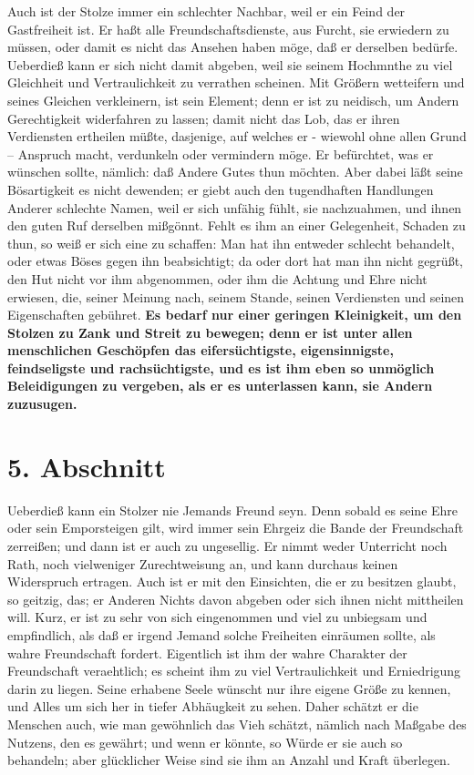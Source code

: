 Auch ist der Stolze immer ein schlechter Nachbar, weil er ein Feind der
Gastfreiheit ist. Er haßt alle Freundschaftsdienste, aus Furcht, sie erwiedern
zu müssen, oder damit es nicht das Ansehen haben möge, daß er derselben bedürfe.
Ueberdieß kann er sich nicht damit abgeben, weil sie seinem Hochmnthe zu viel
Gleichheit und Vertraulichkeit zu verrathen scheinen. Mit Größern wetteifern und
seines Gleichen verkleinern, ist sein Element; denn er ist zu neidisch, um
Andern Gerechtigkeit widerfahren zu lassen; damit nicht das Lob, das er ihren
Verdiensten ertheilen müßte, dasjenige, auf welches er - wiewohl ohne allen
Grund -- Anspruch macht, verdunkeln oder vermindern möge. Er befürchtet, was er
wünschen sollte, nämlich: daß Andere Gutes thun möchten. Aber dabei läßt seine
Bösartigkeit es nicht dewenden; er giebt auch den tugendhaften Handlungen
Anderer schlechte Namen, weil er sich unfähig fühlt, sie nachzuahmen, und ihnen
den guten Ruf derselben mißgönnt. Fehlt es ihm an einer Gelegenheit, Schaden zu
thun, so weiß er sich eine zu schaffen: Man hat ihn entweder schlecht behandelt,
oder etwas Böses gegen ihn beabsichtigt; da oder dort hat man ihn nicht gegrüßt,
den Hut nicht vor ihm abgenommen, oder ihm die Achtung und Ehre nicht erwiesen,
die, seiner Meinung nach, seinem Stande, seinen Verdiensten und seinen
Eigenschaften gebühret. \textbf{Es bedarf nur einer geringen Kleinigkeit, um den Stolzen
zu Zank und Streit zu bewegen; denn er ist unter allen menschlichen Geschöpfen
das eifersüchtigste, eigensinnigste, feindseligste und rachsüchtigste, und es
ist ihm eben so unmöglich Beleidigungen zu vergeben, als er es unterlassen kann,
sie Andern zuzusugen.}

\section{5. Abschnitt} \label{kap12_ab5}

Ueberdieß kann ein Stolzer nie Jemands Freund seyn. Denn sobald es seine Ehre
oder sein Emporsteigen gilt, wird immer sein Ehrgeiz die Bande der Freundschaft
zerreißen; und dann ist er auch zu ungesellig. Er nimmt weder Unterricht noch
Rath, noch vielweniger Zurechtweisung an, und kann durchaus keinen Widerspruch
ertragen. Auch ist er mit den Einsichten, die er zu besitzen glaubt, so geitzig,
das; er Anderen Nichts davon abgeben oder sich ihnen nicht mittheilen will.
Kurz, er ist zu sehr von sich eingenommen und viel zu unbiegsam und empfindlich,
als daß er irgend Jemand solche Freiheiten einräumen sollte, als wahre
Freundschaft fordert. Eigentlich ist ihm der wahre Charakter der Freundschaft
veraehtlich; es scheint ihm zu viel Vertraulichkeit und Erniedrigung darin zu
liegen. Seine erhabene Seele wünscht nur ihre eigene Größe zu kennen, und Alles
um sich her in tiefer Abhäugkeit zu sehen. Daher schätzt er die Menschen auch,
wie man gewöhnlich das Vieh schätzt, nämlich nach Maßgabe des Nutzens, den es
gewährt; und wenn er könnte, so Würde er sie auch so behandeln; aber glücklicher
Weise sind sie ihm an Anzahl und Kraft überlegen.

